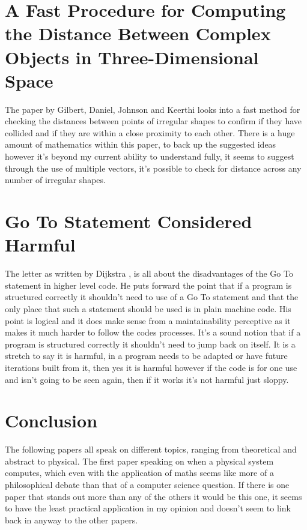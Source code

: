 \documentclass{scrartcl}
\begin{document}
\section{A Fast Procedure for Computing the Distance Between Complex Objects in Three-Dimensional Space}
The paper by Gilbert, Daniel, Johnson and Keerthi \cite{gilbert1988fast}  looks into a fast method for checking the distances between points of irregular shapes to confirm if they have collided and if they are within a close proximity to each other. There is a huge amount of mathematics within this paper, to back up the suggested ideas however it's beyond my current ability to understand fully, it seems to suggest through the use of multiple vectors, it's possible to check for distance across any number of irregular shapes. 

\section{Go To Statement Considered Harmful}
The letter as written by Dijkstra \cite{dijkstra1968letters}, is all about the disadvantages of the Go To statement in higher level code. He puts forward the point that if a program is structured correctly it shouldn't need to use of a Go To statement and that the only place that such a statement should be used is in plain machine code. His point is logical and it does make sense from a maintainability perceptive as it makes it much harder to follow the codes processes. It's a sound notion that if a program is structured correctly it shouldn't need to jump back on itself. It is a stretch to say it is harmful, in a program needs to be adapted or have future iterations built from it, then yes it is harmful however if the code is for one use and isn't going to be seen again, then if it works it's not harmful just sloppy.

\section{Conclusion}
The following papers all speak on different topics, ranging from theoretical and abstract to physical. The first paper speaking on when a physical system computes, which even with the application of maths seems like more of a philosophical debate than that of a computer science question. If there is one paper that stands out more than any of the others it would be this one, it seems to have the least practical application in my opinion and doesn't seem to link back in anyway to the other papers.
\end{document}
